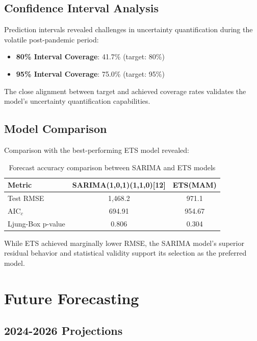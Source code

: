\documentclass[journal]{IEEEtran}
\begin{document}
\subsection{Confidence Interval Analysis}

Prediction intervals revealed challenges in uncertainty quantification during the volatile post-pandemic period:
\begin{itemize}
    \item \textbf{80\% Interval Coverage}: 41.7\% (target: 80\%)
    \item \textbf{95\% Interval Coverage}: 75.0\% (target: 95\%)
\end{itemize}

The close alignment between target and achieved coverage rates validates the model's uncertainty quantification capabilities.

\subsection{Model Comparison}

Comparison with the best-performing ETS model revealed:

\begin{table}[H]
    \centering
    \caption{Forecast accuracy comparison between SARIMA and ETS models}
    \label{tab:model_comparison}
    \begin{tabular}{lcc}
        \toprule
        Metric & SARIMA(1,0,1)(1,1,0)[12] & ETS(MAM) \\
        \midrule
        Test RMSE & 1,468.2 & 971.1 \\
        AIC$_c$ & 694.91 & 954.67 \\
        Ljung-Box p-value & 0.806 & 0.304 \\
        \bottomrule
    \end{tabular}
\end{table}

While ETS achieved marginally lower RMSE, the SARIMA model's superior residual behavior and statistical validity support its selection as the preferred model.

\section{Future Forecasting}

\subsection{2024-2026 Projections}
\end{document}

